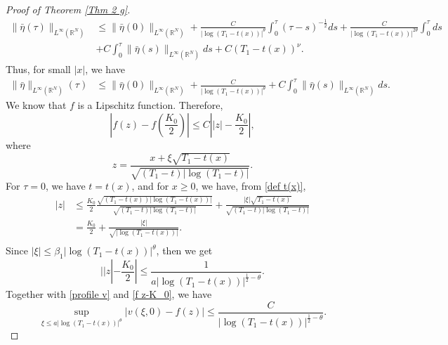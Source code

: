 \documentclass[11pt,a4paper]{article}
\newcommand{\1}{\mathbbm{1}}
\numberwithin{equation}{section}
\newcommand{\numberset}{\mathbb}
\newcommand{\R}{\numberset{R}}
\theoremstyle{remark}
\begin{document}
\begin{proof}[Proof of Theorem \ref{Thm 2 g}]
\begin{equation}\label{control bar eta}
\begin{split}
\|\bar{\eta}(\tau)\|_{L^\infty(\R^N)}&\leq\|\bar{\eta}(0)\|_{L^\infty(\R^N)}+\frac{C}{|\log (T_1-t(x))|^{\theta}}\int^\tau_0(\tau-s)^{-\frac{1}{2}}ds+\frac{C}{|\log (T_1-t(x))|^{2\theta}}\int^\tau_0ds\\
&+C\int^\tau_0 \|\bar{\eta}(s)\|_{L^\infty(\R^N)}ds+C(T_1-t(x))^{\nu}.
\end{split}
\end{equation}
Thus, for small $|x|$, we have
\begin{equation}\label{eta 0 left 2}
\begin{split}
\|\bar{\eta}\|_{L^\infty(\R^N)}(\tau)&\leq\|\bar{\eta}(0)\|_{L^\infty(\R^N)}+\frac{C}{|\log (T_1-t(x))|^{\theta}}+C\int^\tau_0 \|\bar{\eta}(s)\|_{L^\infty(\R^N)}ds.
\end{split}
\end{equation}
We know that $f$ is a Lipschitz function. Therefore,
\begin{equation}\label{f z-K_0}
\left|f(z)-f\left(\frac{K_0}{2}\right)\right|\leq C\left||z|-\frac{K_0}{2}\right|,
\end{equation}
where 
$$z=\frac{x+\xi\sqrt{T_1-t(x)}}{\sqrt{(T_1-t)|\log(T_1-t)|}}.$$
For $\tau =0$, we have $t=t(x)$, and for $x\geq 0$, we have, from \eqref{def t(x)},
\begin{equation*}
\begin{split}
|z|&\leq\frac{K_0}{2}\frac{\sqrt{(T_1-t(x))|\log(T_1-t(x))|}}{\sqrt{(T_1-t)|\log(T_1-t)|}}+\frac{|\xi|\sqrt{T_1-t(x)}}{\sqrt{(T_1-t)|\log(T_1-t)|}}\\
&=\frac{K_0}{2}+\frac{|\xi|}{\sqrt{|\log(T_1-t(x))|}}.\\
\end{split}
\end{equation*}
Since $|\xi|\leq \beta_1|\log(T_1-t(x))|^\theta$, then we get
\begin{equation*}
||z|-\frac{K_0}{2}|\leq \frac{1}{a|\log(T_1-t(x))|^{\frac{1}{2}-\theta}}.
\end{equation*}
Together with \eqref{profile v} and \eqref{f z-K_0}, we have 
\begin{equation*}
\underset{\xi\leq a |\log(T_1-t(x))|^{\theta}}{\sup}\left|v(\xi,0)-f(z)\right|\leq \frac{C}{|\log(T_1-t(x))|^{\frac{1}{2}-\theta}}.

\end{equation*}
\end{proof}
\end{document}
